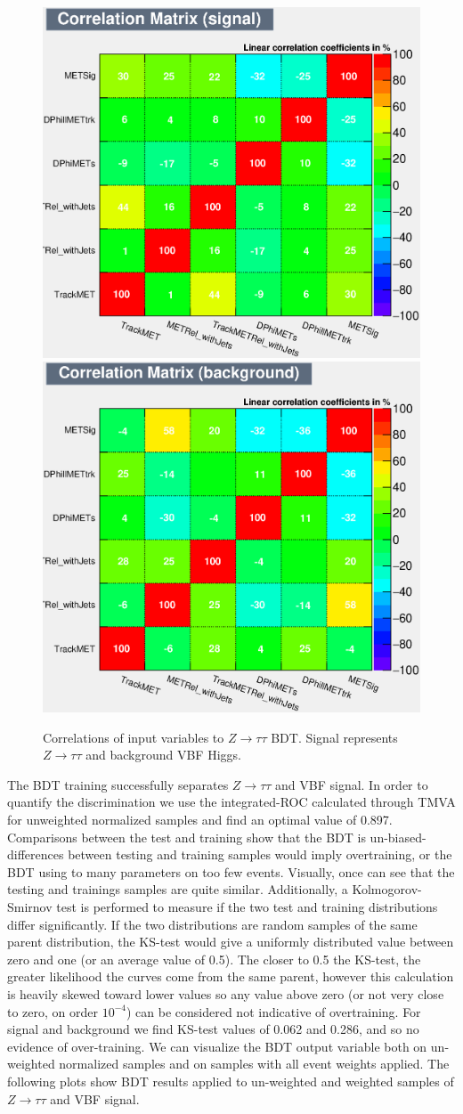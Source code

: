 \begin{figure}[!htbp]
\centering
  \includegraphics[width=.4\linewidth]{Pictures/CorrelationMatrixS.eps}
  \includegraphics[width=.4\linewidth]{Pictures/CorrelationMatrixB.eps}
\caption{Correlations of input variables to $Z\rightarrow\tau\tau$ BDT. Signal represents $Z\rightarrow\tau\tau$ and background VBF Higgs.}
\label{fig:ZjetscorrSB}
\end{figure}
The BDT training successfully separates $Z\rightarrow\tau\tau$ and VBF signal. In order to quantify the discrimination we use the integrated-ROC calculated through TMVA for unweighted normalized samples and find an optimal value of 0.897. Comparisons between the test and training show that the BDT is un-biased- differences between testing and training samples would imply overtraining, or the BDT using to many parameters on too few events. Visually, once can see that the testing and trainings samples are quite similar. Additionally, a Kolmogorov-Smirnov test is performed to measure if the two test and training distributions differ significantly. If the two distributions are random samples of the same parent distribution, the KS-test would give a uniformly distributed value between zero and one (or an average value of 0.5). The closer to 0.5 the KS-test, the greater likelihood the curves come from the same parent, however this calculation is heavily skewed toward lower values so any value above zero (or not very close to zero, on order $10^{-4}$) can be considered not indicative of overtraining. For signal and background we find KS-test values of 0.062 and 0.286, and so no evidence of over-training. We can visualize the BDT output variable both on un-weighted normalized samples and on samples with all event weights applied. The following plots show BDT results applied to un-weighted and weighted samples of $Z\rightarrow\tau\tau$ and VBF signal.

